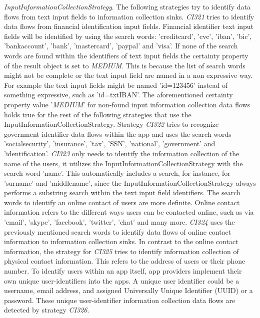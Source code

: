 \textit{InputInformationCollectionStrategy}. The following strategies try to identify data flows from text input fields to information collection sinks.
\textit{CI321} tries to identify data flows from financial identification input fields. 
Financial identifier text input fields will be identified by using the search words: 'creditcard', 'cvc', 'iban', 'bic', 'bankaccount', 'bank', 'mastercard', 'paypal' and 'visa'.
If none of the search words are found within the identifiers of text input fields the certainty property of the result object is set to \textit{MEDIUM}.
This is because the list of search words might not be complete or the text input field are named in a non expressive way.
For example the text input fields might be named 'id=123456' instead of something expressive, such as 'id=txtIBAN'.
The aforementioned certainty property value '\textit{MEDIUM}' for non-found input information collection data flows holds true for the rest of the following strategies that use the InputInformationCollectionStrategy.
Strategy \textit{CI322} tries to recognize government identifier data flows within the app and uses the search words 'socialsecurity', 'insurance', 'tax', 'SSN', 'national', 'government' and 'identification'.
\textit{CI323} only needs to identify the information collection of the name of the users, it utilizes the InputInformationCollectionStrategy with the search word 'name'. 
This automatically includes a search, for instance, for 'surname' and 'middlename', since the InputInformationCollectionStrategy always performs a substring search within the text input field identifiers.
The search words to identify an online contact of users are more definite.
Online contact information refers to the different ways users can be contacted online, such as via 'email', 'skype', 'facebook', 'twitter', 'chat' and many more.
\textit{CI324} uses the previously mentioned search words to identify data flows of online contact information to information collection sinks.
In contrast to the online contact information, the strategy for \textit{CI325} tries to identify information collection of physical contact information.
This refers to the address of users or their phone number.
To identify users within an app itself, app providers implement their own unique user-identifiers into the apps.
A unique user identifier could be a username, email address, and assigned Universally Unique Identifier (\acs{UUID}) or a password.
These unique user-identifier information collection data flows are detected by strategy \textit{CI326}.
